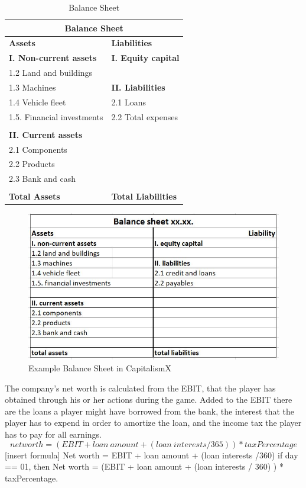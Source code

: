 \begin{table}[ht]
\label{tab:balanceSheet}
\begin{tabular}{|p{5.9cm}|p{5.9cm}|}
\hline
\multicolumn{2}{|c|}{\textbf{Balance Sheet}}\\
\hline \textbf{Assets} & \textbf{Liabilities}\\ 
\hline \textbf{I. Non-current assets} & \textbf{I. Equity capital}\\
\hline 1.2 Land and buildings &\\
\hline 1.3 Machines & \textbf{II. Liabilities}\\
\hline 1.4 Vehicle fleet & 2.1 Loans\\
\hline 1.5. Financial investments &  2.2 Total expenses\\
\hline &\\
\hline \textbf{II. Current assets} &\\
\hline 2.1 Components &\\
\hline 2.2 Products &\\
\hline 2.3 Bank and cash &\\
\hline &\\
\hline \textbf{Total Assets} & \textbf{Total Liabilities}\\
\hline
\end{tabular}
\caption{Balance Sheet}
\end{table}

\begin{figure}
\label{fig:BalanceSheet}
	\centering
	\includegraphics[width=12cm]{images/balance sheet.JPG}
	\caption{Example Balance Sheet in CapitalismX}
\end{figure}

The company’s net worth is calculated from the EBIT, that the player has obtained through his or her actions during the game. Added to the EBIT there are the loans a player might have borrowed from the bank, the interest that the player has to expend in order to amortize the loan, and the income tax the player has to pay for all earnings. \\
$$net worth= (EBIT+loan\ amount+(loan\ interests/365))* taxPercentage$$
[insert formula]
Net worth = EBIT + loan amount + (loan interests /360) if day == 01, then Net worth = (EBIT + loan amount + (loan interests / 360) ) * taxPercentage.

